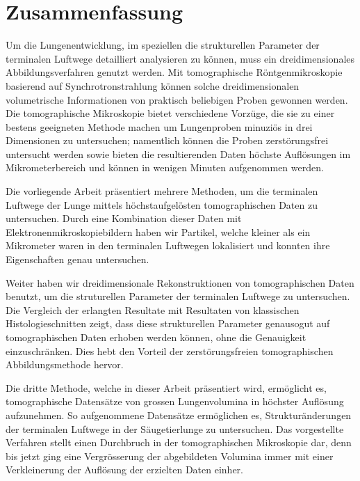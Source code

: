 %
\begingroup%
\let\clearpage\relax%
\let\cleardoublepage\relax%
\let\cleardoublepage\relax%
%
%
\chapter*{Zusammenfassung}
Um die Lungenentwicklung, im speziellen die strukturellen Parameter der terminalen Luftwege detailliert analysieren zu können, muss ein dreidimensionales Abbildungsverfahren genutzt werden. Mit tomographische Röntgenmikroskopie basierend auf Synchrotronstrahlung können solche dreidimensionalen volumetrische Informationen von praktisch beliebigen Proben gewonnen werden. Die tomographische Mikroskopie bietet verschiedene Vorzüge, die sie zu einer bestens geeigneten Methode machen um Lungenproben minuziös in drei Dimensionen zu untersuchen; namentlich können die Proben zerstörungsfrei untersucht werden sowie bieten die resultierenden Daten höchste Auflösungen im Mikrometerbereich und können in wenigen Minuten aufgenommen werden.

Die vorliegende Arbeit präsentiert mehrere Methoden, um die terminalen Luftwege der Lunge mittels höchstaufgelösten tomographischen Daten zu untersuchen. Durch eine Kombination dieser Daten mit Elektronenmikroskopiebildern haben wir Partikel, welche kleiner als ein Mikrometer waren in den terminalen Luftwegen lokalisiert und konnten ihre Eigenschaften genau untersuchen.

Weiter haben wir dreidimensionale Rekonstruktionen von tomographischen Daten benutzt, um die struturellen Parameter der terminalen Luftwege zu untersuchen. Die Vergleich der erlangten Resultate mit Resultaten von klassischen Histologieschnitten zeigt, dass diese strukturellen Parameter genausogut auf tomographischen Daten erhoben werden können, ohne die Genauigkeit einzuschränken. Dies hebt den Vorteil der zerstörungsfreien tomographischen Abbildungsmethode hervor.

Die dritte Methode, welche in dieser Arbeit präsentiert wird, ermöglicht es, tomographische Datensätze von grossen Lungenvolumina in höchster Auflösung aufzunehmen. So aufgenommene Datensätze ermöglichen es, Strukturänderungen der terminalen Luftwege in der Säugetierlunge zu untersuchen. Das vorgestellte Verfahren stellt einen Durchbruch in der tomographischen Mikroskopie dar, denn bis jetzt ging eine Vergrösserung der abgebildeten Volumina immer mit einer Verkleinerung der Auflösung der erzielten Daten einher.
%
\endgroup%